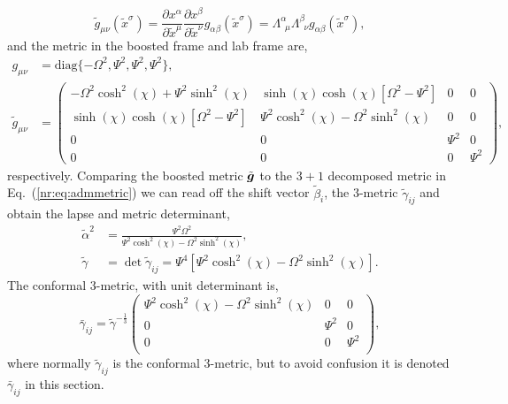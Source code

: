 \begin{equation}
\tilde{g}_{\mu\nu}(\tilde{x}^\sigma)= \frac{\partial x^\alpha}{\partial \tilde{x}^\mu}  \frac{\partial x^\beta}{\partial \tilde{x}^\nu}g_{\alpha\beta}(\tilde{x}^\sigma) = \Lambda^\alpha_{\,\,\,\mu}\Lambda^\beta_{\,\,\,\nu} g_{\alpha\beta}(\tilde{x}^\sigma),
\end{equation}
and the metric in the boosted frame and lab frame are,
\begin{align}
 g_{\mu\nu} &= \mathrm{diag} \{ -\Omega^2, \Psi^2,  \Psi^2, \Psi^2\} ,\\
 \tilde{g}_{\mu\nu}&=\begin{pmatrix} -\Omega^2\cosh^2 (\chi) + \Psi^2 \sinh^2 (\chi) & \sinh(\chi)\cosh(\chi)\left[\Omega^2-\Psi^2\right] & 0& 0 \\  \sinh(\chi)\cosh(\chi)\left[\Omega^2-\Psi^2\right] & \Psi^2 \cosh^2 (\chi) - \Omega^2 \sinh^2 (\chi) & 0 & 0\\ 0 & 0&\Psi^2&0 \\ 0&0&0&\Psi^2\end{pmatrix},
 \end{align} 
 respectively. Comparing the boosted metric $\tilde{\boldsymbol{g}}$ to the $3+1$ decomposed metric in Eq.~(\ref{nr:eq:admmetric}) we can read off the shift vector $\tilde{\beta}_i$, the 3-metric $\tilde{\gamma}_{ij}$ and obtain the lapse and metric determinant,
\begin{align} 
\tilde{\alpha}^2 &= \frac{\Psi ^2 \Omega ^2}{\Psi ^2 \cosh ^2(\chi) -\Omega ^2 \sinh ^2(\chi) },\\ 
\tilde{\gamma} &= \det \tilde{\gamma}_{ij} = \Psi^4\left[ \Psi^2 \cosh^2 (\chi) - \Omega^2 \sinh^2(\chi)\right].
\end{align}
The conformal 3-metric, with unit determinant is, 
\begin{equation} \bar{\gamma}_{ij} = \tilde{\gamma}^{-\frac{1}{3}}\left(
\begin{array}{ccc}
 \Psi ^2 \cosh ^2(\chi) -\Omega ^2 \sinh ^2(\chi)  & 0 & 0 \\
 0 & \Psi ^2 & 0 \\
 0 & 0 & \Psi ^2 \\
\end{array}
\right),\end{equation}
where normally $\tilde{\gamma}_{ij}$ is the conformal 3-metric, but to avoid confusion it is denoted $\bar{\gamma}_{ij}$ in this section. 

